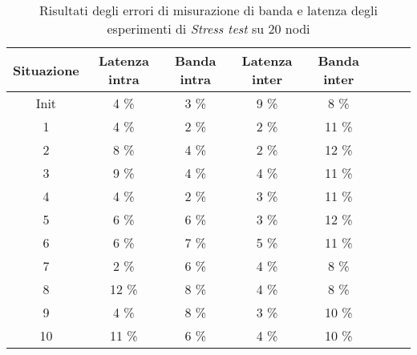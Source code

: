     \begin{table}[H]
    \caption{Risultati degli errori di misurazione di banda e latenza degli esperimenti di \textit{Stress test} su 20 nodi}
    \label{tab:stresstest20qos2}
    \begin{center}
        \begin{tabular}{|c|c|c|c|c|c|c|c|}
            \hline
            Situazione & Latenza intra & Banda intra & Latenza inter & Banda inter\\
            \hline
            Init & 4 \% & 3 \% & 9 \% & 8 \%  \\
            1    & 4 \% & 2 \% & 2 \% & 11 \% \\
            2    & 8 \% & 4 \% & 2 \% & 12 \% \\
            3    & 9 \% & 4 \% & 4 \% & 11 \% \\
            4    & 4 \% & 2 \% & 3 \% & 11 \% \\
            5    & 6 \% & 6 \% & 3 \% & 12 \% \\
            6    & 6 \% & 7 \% & 5 \% & 11 \%  \\
            7    & 2 \% & 6 \% & 4 \% & 8  \% \\
            8    & 12 \% & 8 \% & 4 \% & 8  \% \\
            9    & 4 \% & 8 \% & 3 \%  & 10 \% \\
            10   & 11 \% & 6 \% & 4 \% & 10 \% \\
            \hline
        \end{tabular}
        \end{center}
    \end{table}
\newpage